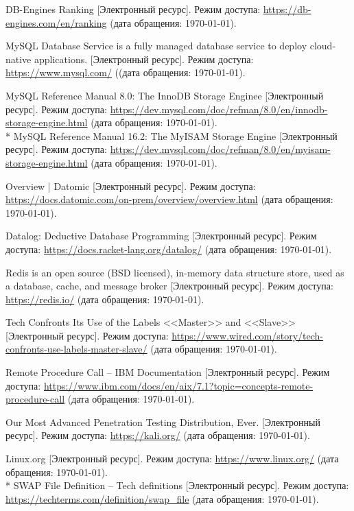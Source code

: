 \begin{thebibliography}{}
	DB-Engines Ranking [Электронный ресурс].
	\newblock Режим доступа: \url{https://db-engines.com/en/ranking}
	(дата обращения: \today).
	
	MySQL Database Service is a fully managed database service to deploy
	cloud-native applications. [Электронный ресурс].
	\newblock Режим доступа: \url{https://www.mysql.com/} ((дата
	обращения: \today).
	
	MySQL Reference Manual 8.0: The InnoDB Storage Enginee [Электронный
	ресурс].
	\newblock Режим доступа:
	\url{https://dev.mysql.com/doc/refman/8.0/en/innodb-storage-engine.html}
	(дата обращения: \today).
	\\*
	MySQL Reference Manual 16.2: The MyISAM Storage Engine [Электронный
	ресурс].
	\newblock Режим доступа:
	\url{https://dev.mysql.com/doc/refman/8.0/en/myisam-storage-engine.html}
	(дата обращения: \today).
	
	Overview | Datomic [Электронный ресурс].
	\newblock Режим доступа:
	\url{https://docs.datomic.com/on-prem/overview/overview.html} (дата
	обращения: \today).
	
	Datalog: Deductive Database Programming [Электронный ресурс].
	\newblock Режим доступа:
	\url{https://docs.racket-lang.org/datalog/} (дата обращения:
	\today).
	
	Redis is an open source (BSD licensed), in-memory data structure store, used as
	a database, cache, and message broker [Электронный ресурс].
	\newblock Режим доступа: \url{https://redis.io/} (дата
	обращения: \today).
	
	Tech Confronts Its Use of the Labels <<Master>> and <<Slave>>
	[Электронный ресурс].
	\newblock Режим доступа:
	\url{https://www.wired.com/story/tech-confronts-use-labels-master-slave/}
	(дата обращения: \today).
	
	Remote Procedure Call -- IBM Documentation [Электронный
	ресурс].
	\newblock Режим доступа:
	\url{https://www.ibm.com/docs/en/aix/7.1?topic=concepts-remote-procedure-call}
	(дата обращения: \today).
	
	Our Most Advanced Penetration Testing Distribution, Ever.
	[Электронный ресурс].
	\newblock Режим доступа: \url{https://kali.org/} (дата
	обращения: \today).
	
	Linux.org [Электронный ресурс].
	\newblock Режим доступа: \url{https://www.linux.org/}
	(дата обращения: \today).
	\\*
	SWAP File Definition -- Tech definitions [Электронный ресурс].
	\newblock Режим доступа:
	\url{https://techterms.com/definition/swap_file} (дата
	обращения: \today).
	

\end{thebibliography}
